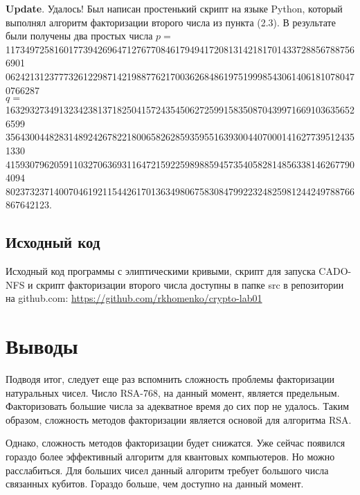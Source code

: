 \documentclass[a4paper,12pt]{article}
\begin{document}
\textbf{Update}. Удалось! Был написан простенький скрипт на языке
Python, который выполнял алгоритм факторизации второго числа из пункта
(2.3). В результате были получены два простых числа
$p = $ 1173497258160177394269647127677084617949417208131421817014337288567887566901 \\
       0624213123777326122987142198877621700362684861975199985430614061810780470766287 \\
$q = $ 1632932734913234238137182504157243545062725991583508704399716691036356526599 \\
       3564300448283148924267822180065826285935955163930044070001416277395124351330 \\
       4159307962059110327063693116472159225989885945735405828148563381462677904094 \\
       802373237140070461921154426170136349806758308479922324825981244249788766867642123.

\subsection{Исходный код}
Исходный код программы с элиптическими кривыми, скрипт для запуска CADO-NFS и скрипт факторизации
второго числа доступны в папке src в репозитории на github.com: \url{https://github.com/rkhomenko/crypto-lab01}

\section{Выводы}
Подводя итог, следует еще раз вспомнить сложность проблемы факторизации
натуральных чисел. Число RSA-768, на данный момент, является предельным.
Факторизовать большие числа за адекватное время до сих пор не удалось.
Таким образом, сложность методов факторизации является основой
для алгоритма RSA.

Однако, сложность методов факторизации будет снижатся. Уже
сейчас появился гораздо более эффективный алгоритм для
квантовых компьютеров. Но можно расслабиться. Для больших
чисел данный алгоритм требует большого числа связанных кубитов.
Гораздо больше, чем доступно на данный момент.
\end{document}
